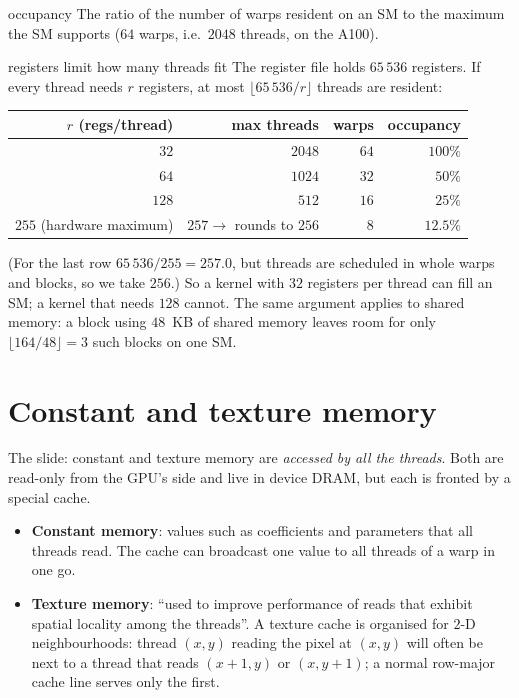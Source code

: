 \begin{definition}{occupancy}
The ratio of the number of warps resident on an SM to the maximum the SM supports ($64$ warps, i.e.\ $2048$ threads, on the A100).
\end{definition}
\begin{workedex}{registers limit how many threads fit}
The register file holds $65\,536$ registers. If every thread needs $r$ registers, at most $\lfloor65\,536/r\rfloor$ threads are resident:
\begin{center}\small
\begin{tabular}{@{}rrrr@{}}
\toprule
$r$ (regs/thread) & max threads & warps & occupancy\\
\midrule
$32$ & $2048$ & $64$ & $100\%$\\
$64$ & $1024$ & $32$ & $50\%$\\
$128$ & $512$ & $16$ & $25\%$\\
$255$ (hardware maximum) & $257\to$ rounds to $256$ & $8$ & $12.5\%$\\
\bottomrule
\end{tabular}
\end{center}
(For the last row $65\,536/255=257.0$, but threads are scheduled in whole warps and blocks, so we take $256$.) So a kernel with $32$ registers per thread can fill an SM; a kernel that needs $128$ cannot.
The same argument applies to shared memory: a block using $48$~KB of shared memory leaves room for only $\lfloor164/48\rfloor=3$ such blocks on one SM.
\end{workedex}

\section{Constant and texture memory}


The slide: constant and texture memory are \emph{accessed by all the threads}. Both are read-only from the GPU's side and live in device DRAM, but each is fronted by a special cache.
\begin{itemize}
  \item \textbf{Constant memory}: values such as coefficients and parameters that all threads read. The cache can broadcast one value to all threads of a warp in one go.
  \item \textbf{Texture memory}: ``used to improve performance of reads that exhibit spatial locality among the threads''. A texture cache is organised for $2$-D neighbourhoods: thread $(x,y)$ reading the pixel at $(x,y)$ will often be next to a thread that reads $(x+1,y)$ or $(x,y+1)$; a normal row-major cache line serves only the first.
\end{itemize}

